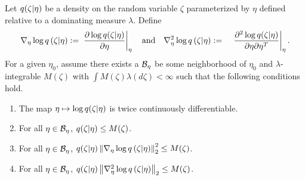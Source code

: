 

\begin{assu}
%
Let $q(\zeta \vert \eta)$ be a density on the random variable $\zeta$
parameterized by $\eta$ defined relative to a dominating measure $\lambda$.
%
Define
%
\begin{align*}
%
\lqgrad{\zeta \vert \eta} :={}&
    \fracat{\partial \log \q(\zeta \vert \eta)}{\partial \eta}{\eta}
    \mathtxt{and}
%
\lqhess{\zeta \vert \eta} :={}&
    \fracat{\partial^2 \log \q(\zeta \vert \eta)}
           {\partial \eta \partial \eta^T}{\eta}.
%
\end{align*}
%
For a given $\eta_0$, assume there exists a $\mathcal{B}_\eta$ be some neighborhood of
$\eta_0$ and $\lambda$-integrable $M(\zeta)$ with $\int M(\zeta) \lambda(d\zeta) <
\infty$ such that the following conditions hold.
%
\begin{enumerate}
%
\item  {} The map $\eta \mapsto \log q(\zeta \vert \eta)$
is twice continuously differentiable.
%
\item {} For all $\eta \in \mathcal{B}_\eta$, $q(\zeta \vert \eta) \le
M(\zeta)$.
%
\item {} For all $\eta \in \mathcal{B}_\eta$, $q(\zeta \vert \eta)
\left\Vert{\nabla_\eta \log q}\left(\zeta \vert \eta\right)\right\Vert^2_2 \le M(\zeta)$.
%
\item {} For all $\eta \in \mathcal{B}_\eta$, $q(\zeta \vert \eta)
\left\Vert{\nabla_\eta^2 \log q}\left(\zeta \vert \eta\right)\right\Vert_2 \le M(\zeta)$.
%
\end{enumerate}
%
\end{assu}

